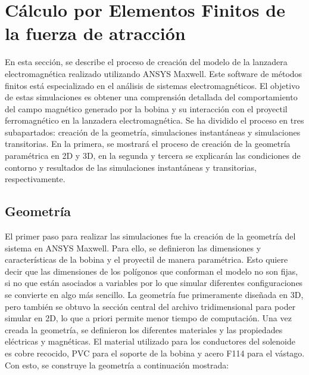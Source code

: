 \section{Cálculo por Elementos Finitos de la fuerza de atracción}
\label{sec:simulaciones}

En esta sección, se describe el proceso de creación del modelo de la lanzadera electromagnética realizado utilizando ANSYS Maxwell. Este software de métodos finitos está especializado en el análisis de sistemas electromagnéticos. El objetivo de estas simulaciones es obtener una comprensión detallada del comportamiento del campo magnético generado por la bobina y su interacción con el proyectil ferromagnético en la lanzadera electromagnética. Se ha dividido el proceso en tres subapartados: creación de la geometría, simulaciones instantáneas y simulaciones transitorias. En la primera, se mostrará el proceso de creación de la geometría paramétrica en 2D y 3D, en la segunda y tercera se explicarán las condiciones de contorno y resultados de las simulaciones instantáneas y transitorias, respectivamente.

\subsection{Geometría}
El primer paso para realizar las simulaciones fue la creación de la geometría del sistema en ANSYS Maxwell. Para ello, se definieron las dimensiones y características de la bobina y el proyectil de manera paramétrica. Esto quiere decir que las dimensiones de los polígonos que conforman el modelo no son fijas, si no que están asociados a variables por lo que simular diferentes configuraciones se convierte en algo más sencillo. La geometría fue primeramente diseñada en 3D, pero también se obtuvo la sección central del archivo tridimensional para poder simular en 2D, lo que a priori permite menor tiempo de computación. Una vez creada la geometría, se definieron los diferentes materiales y las propiedades eléctricas y magnéticas. El material utilizado para los conductores del solenoide es cobre recocido, PVC para el soporte de la bobina y acero F114 para el vástago. Con esto, se construye la geometría a continuación mostrada:

